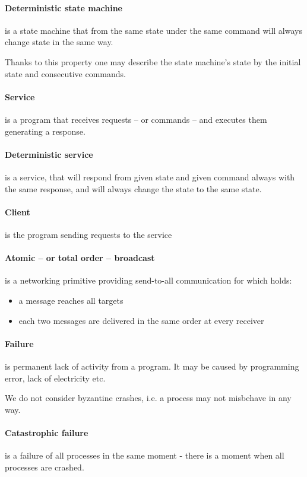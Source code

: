 \paragraph{Deterministic state machine}
is a state machine that from the same state under the same command will always change state in the same way.

Thanks to this property one may describe the state machine's state by the initial state and consecutive commands. 

\paragraph{Service}
is a program that receives requests -- or commands -- and executes them generating a response.

\paragraph{Deterministic service}
is a service, that will respond from given state and given command always with the same response, and will always change the state to the same state.

\paragraph{Client}
is the program sending requests to the service

\paragraph{Atomic -- or total order -- broadcast}
is a networking primitive providing send-to-all communication for which holds:
\begin{itemize}
 \item a message reaches all targets
 \item each two messages are delivered in the same order at every receiver
\end{itemize}

\paragraph{Failure}
is permanent lack of activity from a program. It may be caused by programming error, lack of electricity etc.

We do not consider byzantine crashes, i.e. a process may not misbehave in any way.

\paragraph{Catastrophic failure} is a failure of all processes in the same moment - there is a moment when all processes are crashed.

